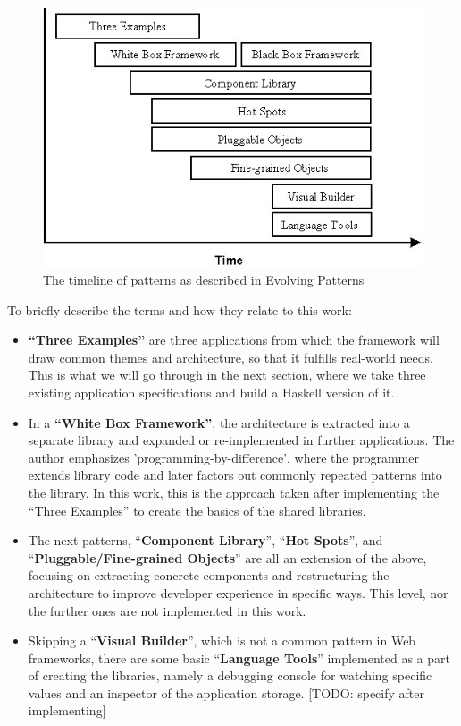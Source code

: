 \documentclass[english,odsaz]{fitthesis}
\begin{document}
\begin{figure}[htbp]
\centering
\includegraphics[width=.9\linewidth]{./obrazky-figures/evolving-frameworks.jpg}
\caption{The timeline of patterns as described in Evolving Patterns}
\end{figure}

To briefly describe the terms and how they relate to this work:
\begin{itemize}
\item \textbf{``Three Examples''} are three applications from which the framework will
draw common themes and architecture, so that it fulfills real-world needs. This
is what we will go through in the next section, where we take three existing
application specifications and build a Haskell version of it.
\item In a \textbf{``White Box Framework''}, the architecture is extracted into a separate
library and expanded or re-implemented in further applications. The author
emphasizes 'programming-by-difference', where the programmer extends library
code and later factors out commonly repeated patterns into the library. In
this work, this is the approach taken after implementing the ``Three Examples''
to create the basics of the shared libraries.
\item The next patterns, ``\textbf{Component Library}'', ``\textbf{Hot Spots}'', and
``\textbf{Pluggable/Fine-grained Objects}'' are all an extension of the above, focusing
on extracting concrete components and restructuring the architecture to
improve developer experience in specific ways. This level, nor the further
ones are not implemented in this work.
\item Skipping a ``\textbf{Visual Builder}'', which is not a common pattern in Web frameworks,
there are some basic ``\textbf{Language Tools}'' implemented as a part of creating the
libraries, namely a debugging console for watching specific values and an
inspector of the application storage. [TODO: specify after implementing]
\end{itemize}
\end{document}
